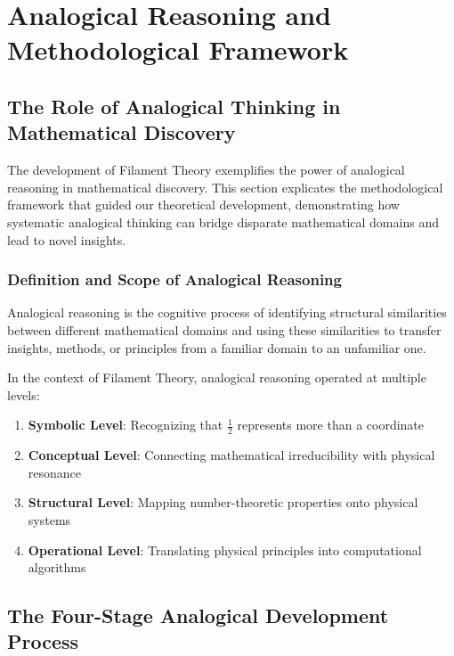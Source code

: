 
\section{Analogical Reasoning and Methodological Framework}

\subsection{The Role of Analogical Thinking in Mathematical Discovery}

The development of Filament Theory exemplifies the power of analogical reasoning in mathematical discovery. This section explicates the methodological framework that guided our theoretical development, demonstrating how systematic analogical thinking can bridge disparate mathematical domains and lead to novel insights.

\subsubsection{Definition and Scope of Analogical Reasoning}

\begin{definition}
Analogical reasoning is the cognitive process of identifying structural similarities between different mathematical domains and using these similarities to transfer insights, methods, or principles from a familiar domain to an unfamiliar one.
\end{definition}

In the context of Filament Theory, analogical reasoning operated at multiple levels:

\begin{enumerate}
\item \textbf{Symbolic Level}: Recognizing that $\frac{1}{2}$ represents more than a coordinate
\item \textbf{Conceptual Level}: Connecting mathematical irreducibility with physical resonance
\item \textbf{Structural Level}: Mapping number-theoretic properties onto physical systems
\item \textbf{Operational Level}: Translating physical principles into computational algorithms
\end{enumerate}

\subsection{The Four-Stage Analogical Development Process}

